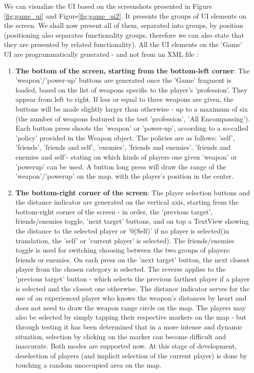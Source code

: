 We can visualize the UI based on the screenshots presented in Figure
\ref{fig:game_ui} and Figure\ref{fig:game_ui2}. It presents the groups of UI
elements on the screen.
We shall now present all of them, separated into groups, by position
(positioning also separates functionality groups, therefore we can also state
that they are presented by related functionality). All the UI elements on the
'Game' UI are programmatically generated - and not from an XML file  :
\begin{enumerate}
  \item\textbf{The bottom of the screen, starting from the bottom-left corner}:
  The 'weapon'/'power-up' buttons are generated once the 'Game' fragment is
  loaded, based on the list of weapons specific to the player's 'profession'. They
  appear from left to right. If less or equal to three weapons are given, the
  buttons will be made slightly larger than otherwise - up to a maximum of six
  (the number of weapons featured in the test 'profession', 'All Encompassing').
  Each button press shoots the 'weapon' or 'power-up', according to a so-called
  'policy' provided in the Weapon object. The policies are as follows: 'self',
  'friends', 'friends and self', 'enemies', 'friends and enemies', 'friends and
  enemies and self'- stating on which kinds of players one given 'weapon' or
  'powerup' can be used. A button long press will draw the range of the
  'weapon'/'powerup' on the map, with the player's position in the center.
  
  \item\textbf{The bottom-right corner of the screen}: The player selection
  buttons and the distance indicator are generated on the vertical axis, starting from the
  bottom-right corner of the screen - in order, the 'previous target',
  friends/enemies toggle, 'next target' buttons, and on top a TextView showing
  the distance to the selected player or '0(Self)' if no player is selected(in
  translation, the 'self' or 'current player' is selected). The friends/enemies
  toggle is used for switching choosing between the two groups of players:
  friends or enemies. On each press on the 'next target' button,
  the next closest player from the chosen category is selected. The reverse
  applies to the 'previous target' button - which selects the previous farthest
  player if a player is selected and the closest one otherwise. The distance
  indicator serves for the use of an experienced player who knows the weapon's
  distances by heart and does not need to draw the weapon range circle on the
  map. The players may also be selected by simply tapping their respective
  markers on the map - but through testing it has been determined that in a more
  intense and dynamic situation, selection by clicking on the marker can become
  difficult and inaccurate. Both modes are supported now. At this stage of
  development, deselection of players (and implicit selection of the current
  player) is done by touching a random unoccupied area on the map.
  

\end{enumerate}
